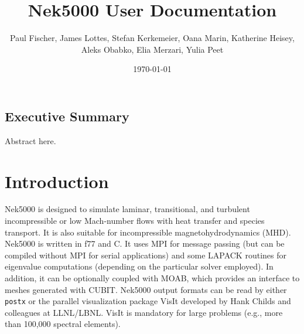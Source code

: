 \documentclass[11pt]{report}              %
\title{Nek5000 User Documentation}    %
\author{Paul Fischer, James Lottes,  Stefan Kerkemeier, Oana Marin, Katherine Heisey, Aleks
Obabko, Elia Merzari, Yulia Peet}              %
\date{\today}                           %
\begin{document}

\maketitle
\clearpage
\thispagestyle{empty}
\tableofcontents
\clearpage

\section*{Executive Summary} 


Abstract here.

\newpage

\setcounter{page}{1}

\chapter{Introduction}

Nek5000 is designed to simulate laminar, transitional, and turbulent
incompressible or low Mach-number flows with heat transfer and species
transport. It is also suitable for incompressible magnetohydrodynamics
(MHD). Nek5000 is written in f77 and C. It uses MPI for message passing
(but can be compiled without MPI for serial applications)
and some LAPACK routines for eigenvalue computations (depending on
the particular solver employed).  In addition, it can be optionally
coupled with MOAB, which provides an interface to meshes generated with 
CUBIT. Nek5000 output formats can be read by either {\tt postx} or the parallel visualization 
package VisIt developed by Hank Childs and colleagues at LLNL/LBNL.
VisIt is mandatory for large problems (e.g., more than 100,000 
spectral elements).
\end{document}

